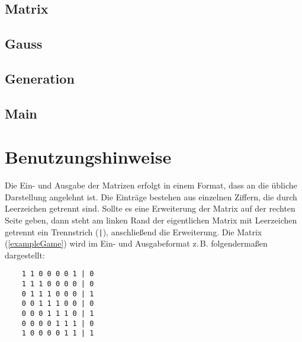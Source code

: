 \documentclass{scrartcl}
\newcommand{\listSec}[1]{%
  \subsection*{#1}
  
}
\begin{document}
\listSec{Matrix}
\listSec{Gauss}
\listSec{Generation}
\listSec{Main}

\section{Benutzungshinweise}
Die Ein- und Ausgabe der Matrizen erfolgt in einem Format, dass an die übliche
Darstellung angelehnt ist. Die Einträge bestehen aus einzelnen Ziffern, die
durch Leerzeichen getrennt sind. Sollte es eine Erweiterung der Matrix auf der
rechten Seite geben, dann steht am linken Rand der eigentlichen Matrix mit
Leerzeichen getrennt ein Trennstrich (\texttt{|}), anschließend die Erweiterung.
Die Matrix (\ref{exampleGame}) wird im Ein- und Ausgabeformat z.\,B.
folgendermaßen dargestellt:
\begin{Verbatim}
    1 1 0 0 0 0 1 | 0
    1 1 1 0 0 0 0 | 0
    0 1 1 1 0 0 0 | 1
    0 0 1 1 1 0 0 | 0
    0 0 0 1 1 1 0 | 1
    0 0 0 0 1 1 1 | 0
    1 0 0 0 0 1 1 | 1
\end{Verbatim}
\end{document}
